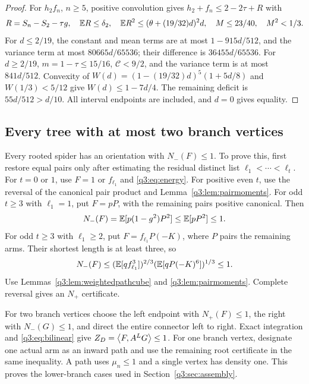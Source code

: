 \begin{proof}
For $h_2f_n$, $n\ge5$, positive convolution gives $h_2+f_n\le2-2\tau+R$ with
\[
 R=S_n-S_2-\tau g,\quad
 \mathbb E R\le \delta_{2},\quad \mathbb E R^2\le(\theta+(19/32)d)^2d,\quad
 M\le23/40,\quad M^2<1/3.
\]
For $d\le2/19$, the constant and mean terms are at most $1-915d/512$, and the variance term at most $80665d/65536$; their difference is $36455d/65536$. For $d\ge2/19$, $m=1-\tau\le15/16$, $\mathcal C<9/2$, and the variance term is at most $841d/512$. Convexity of
$W(d)=(1-(19/32)d)^5(1+5d/8)$ and $W(1/3)<5/12$ give $W(d)\le1-7d/4$. The remaining deficit is $55d/512>d/10$. All interval endpoints are included, and $d=0$ gives equality.
\end{proof}

\subsection{Every tree with at most two branch vertices}\label{q3:app:spiderboundary}
Every rooted spider has an orientation with $N_-(F)\le1$. To prove this, first restore equal pairs only after estimating the residual distinct list $\ell_1<\cdots<\ell_t$. For $t=0$ or $1$, use $F=1$ or $f_{\ell_1}$ and \eqref{q3:eq:energy}. For positive even $t$, use the reversal of the canonical pair product and Lemma~\ref{q3:lem:pairmoments}. For odd $t\ge3$ with $\ell_1=1$, put $F=pP$, with the remaining pairs positive canonical. Then
\[
 N_-(F)=\mathbb E[p(1-g^2)P^2]\le\mathbb E[pP^2]\le1.
\]
For odd $t\ge3$ with $\ell_1\ge2$, put $F=f_{\ell_1}P(-K)$, where $P$ pairs the remaining arms. Their shortest length is at least three, so
\[
 N_-(F)\le(\mathbb E[qf_{\ell_1}^3])^{2/3}
          (\mathbb E[qP(-K)^6])^{1/3}\le1.
\]
Use Lemmas~\ref{q3:lem:weightedpathcube} and \ref{q3:lem:pairmoments}. Complete reversal gives an $N_+$ certificate.

For two branch vertices choose the left endpoint with $N_+(F)\le1$, the right with $N_-(G)\le1$, and direct the entire connector left to right. Exact integration and \eqref{q3:eq:bilinear} give $Z_D=\left\langle F,A^LG\right\rangle\le1$. For one branch vertex, designate one actual arm as an inward path and use the remaining root certificate in the same inequality. A path uses $\mu_n\le1$ and a single vertex has density one. This proves the lower-branch cases used in Section~\ref{q3:sec:assembly}.
